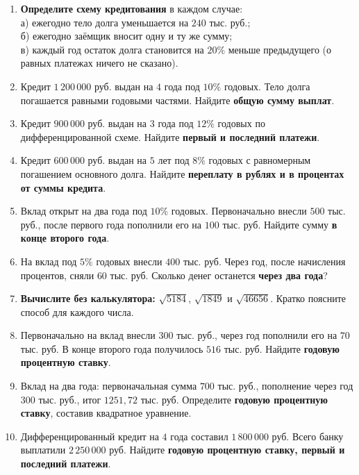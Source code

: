 \documentclass[a4paper,11pt]{article}
\begin{document}
\begin{enumerate}[label=\textbf{\arabic*.}]
\item \textbf{Определите схему кредитования} в каждом случае: \\
а) ежегодно тело долга уменьшается на $240$ тыс. руб.; \\
б) ежегодно заёмщик вносит одну и ту же сумму; \\
в) каждый год остаток долга становится на $20\%$ меньше предыдущего (о равных платежах ничего не сказано).

\item Кредит $1\,200\,000$ руб. выдан на $4$ года под $10\%$ годовых. Тело долга погашается равными годовыми частями. Найдите \textbf{общую сумму выплат}.

\item Кредит $900\,000$ руб. выдан на $3$ года под $12\%$ годовых по дифференцированной схеме. Найдите \textbf{первый и последний платежи}.

\item Кредит $600\,000$ руб. выдан на $5$ лет под $8\%$ годовых с равномерным погашением основного долга. Найдите \textbf{переплату в рублях и в процентах от суммы кредита}.

\item Вклад открыт на два года под $10\%$ годовых. Первоначально внесли $500$ тыс. руб., после первого года пополнили его на $100$ тыс. руб. Найдите сумму \textbf{в конце второго года}.

\item На вклад под $5\%$ годовых внесли $400$ тыс. руб. Через год, после начисления процентов, сняли $60$ тыс. руб. Сколько денег останется \textbf{через два года}?

\item \textbf{Вычислите без калькулятора:} $\sqrt{5184}$, $\sqrt{1849}$ и $\sqrt{46656}$. Кратко поясните способ для каждого числа.

\item Первоначально на вклад внесли $300$ тыс. руб., через год пополнили его на $70$ тыс. руб. В конце второго года получилось $516$ тыс. руб. Найдите \textbf{годовую процентную ставку}.

\item Вклад на два года: первоначальная сумма $700$ тыс. руб., пополнение через год $300$ тыс. руб., итог $1251{,}72$ тыс. руб. Определите \textbf{годовую процентную ставку}, составив квадратное уравнение.

\item Дифференцированный кредит на $4$ года составил $1\,800\,000$ руб. Всего банку выплатили $2\,250\,000$ руб. Найдите \textbf{годовую процентную ставку, первый и последний платежи}.
\end{enumerate}
\end{document}

